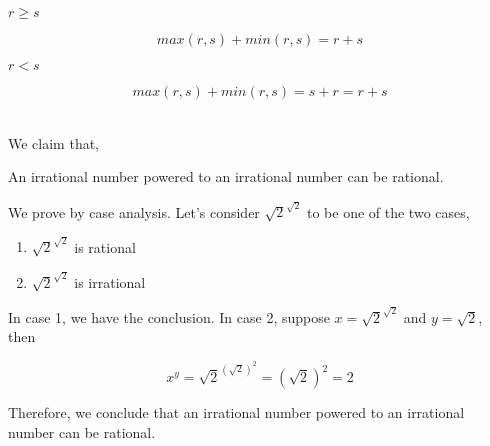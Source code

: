 \begin{pr}\leavevmode
    \begin{casesp}
        \item $r \geq s$
        
        \begin{equation*}
            max(r,s) + min(r,s) = r + s
        \end{equation*}

        \item $r < s$
        
        \begin{equation*}
            max(r,s) + min(r,s) = s + r = r + s
        \end{equation*}
    \end{casesp}
\end{pr}

\begin{pr}\leavevmode
    \\
    We claim that,

    \begin{claimPr}
        An irrational number powered to an irrational number can be rational.
    \end{claimPr}

    We prove by case analysis. Let's consider $\sqrt{2}^{\sqrt{2}}$ to be one of the two cases,

    \begin{enumerate}
        \item $\sqrt{2}^{\sqrt{2}}$ is rational
        \item $\sqrt{2}^{\sqrt{2}}$ is irrational
    \end{enumerate}

    In case 1, we have the conclusion. In case 2, suppose $x = \sqrt{2}^{\sqrt{2}}$
    and $y = \sqrt{2}$, then

    \begin{equation*}
        x^y = \sqrt{2}^{(\sqrt{2})^2} = (\sqrt{2})^2 = 2
    \end{equation*}

    Therefore, we conclude that an irrational number powered to an irrational number
    can be rational.
\end{pr}

